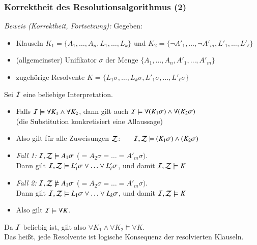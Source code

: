 \documentclass[aspectratio=1610,onlymath]{beamer}
\begin{document}
\begin{frame}\frametitle{Korrektheit des Resolutionsalgorithmus (2)}

\emph{Beweis (Korrektheit, Fortsetzung):} Gegeben:
\begin{itemize}
\item Klauseln $K_1=\{A_1,\ldots,A_n,L_1,\ldots,L_k\}$ und $K_2=\{\neg A'_1,\ldots,\neg A'_m,L'_1,\ldots,L'_\ell\}$
\item (allgemeinster) Unifikator $\sigma$ der Menge $\{A_1,\ldots,A_n,A'_1,\ldots,A'_m\}$
\item zugehörige Resolvente $K=\{L_1\sigma,\ldots,L_k\sigma,L'_1\sigma,\ldots, L'_\ell\sigma\}$\pause
\end{itemize}

Sei $\mathcal{I}$ eine beliebige Interpretation.
\begin{itemize}
\item Falls $\mathcal{I}\models\forall K_1\wedge\forall K_2$, dann gilt auch $\mathcal{I}\models\forall (K_1\sigma)\wedge\forall (K_2\sigma)$\\ (die Substitution konkretisiert eine Allaussage)\pause
\item Also gilt für alle Zuweisungen $\mathcal{Z}$:~~~ $\mathcal{I},\mathcal{Z}\models(K_1\sigma)\wedge (K_2\sigma)$\pause
\item \emph{Fall 1:} $\mathcal{I},\mathcal{Z}\models A_1\sigma$ ($=A_2\sigma=\ldots=A'_m\sigma)$.\\ Dann gilt $\mathcal{I},\mathcal{Z}\models L'_1\sigma\vee\ldots\vee L'_\ell\sigma$, und damit $\mathcal{I},\mathcal{Z}\models K$\pause
\item \emph{Fall 2:} $\mathcal{I},\mathcal{Z}\not\models A_1\sigma$ ($=A_2\sigma=\ldots=A'_m\sigma)$.\\ Dann gilt $\mathcal{I},\mathcal{Z}\models L_1\sigma\vee\ldots\vee L_k\sigma$, und damit $\mathcal{I},\mathcal{Z}\models K$\pause
\item Also gilt $\mathcal{I}\models\forall K$.
\end{itemize}
Da $\mathcal{I}$ beliebig ist, gilt also $\forall K_1\wedge\forall K_2\models \forall K$.\\
Das heißt, jede Resolvente ist logische Konsequenz der resolvierten Klauseln.

\end{frame}
\end{document}
